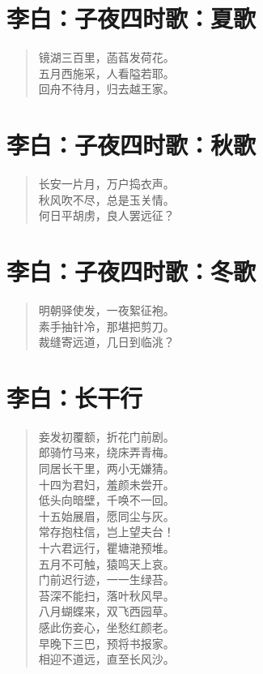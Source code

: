 \documentclass[12pt,oneside]{book}
\newenvironment{shici}{%
\begin{verse}\centering\yanti\large\hspace{12pt}}{\end{verse}}
\begin{document}
\begin{common-format}
\chapter{李白：子夜四时歌：夏歌}
\begin{shici}
镜湖三百里，菡萏发荷花。\\
五月西施采，人看隘若耶。\\
回舟不待月，归去越王家。
\end{shici}

\chapter{李白：子夜四时歌：秋歌}
\begin{shici}
长安一片月，万户捣衣声。\\
秋风吹不尽，总是玉关情。\\
何日平胡虏，良人罢远征？
\end{shici}

\chapter{李白：子夜四时歌：冬歌}
\begin{shici}
明朝驿使发，一夜絮征袍。\\
素手抽针冷，那堪把剪刀。\\
裁缝寄远道，几日到临洮？
\end{shici}

\chapter{李白：长干行}
\begin{shici}
妾发初覆额，折花门前剧。\\
郎骑竹马来，绕床弄青梅。\\
同居长干里，两小无嫌猜。\\
十四为君妇，羞颜未尝开。\\
低头向暗壁，千唤不一回。\\
十五始展眉，愿同尘与灰。\\
常存抱柱信，岂上望夫台！\\
十六君远行，瞿塘滟预堆。\\
五月不可触，猿鸣天上哀。\\
门前迟行迹，一一生绿苔。\\
苔深不能扫，落叶秋风早。\\
八月蝴蝶来，双飞西园草。\\
感此伤妾心，坐愁红颜老。\\
早晚下三巴，预将书报家。\\
相迎不道远，直至长风沙。
\end{shici}


\end{common-format}
\end{document}
